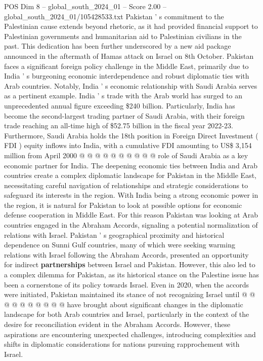 \begin{textsample}{POS Dim 8 – global\_south\_2024\_01 – Score 2.00 – global\_south\_2024\_01/105428533.txt}
Pakistan ' s commitment to the Palestinian cause extends beyond rhetoric, as it had provided financial support to Palestinian governments and humanitarian aid to Palestinian civilians in the past.
This dedication has been further underscored by a new aid package announced in the aftermath of Hamas attack on Israel on 8th October.
Pakistan faces a significant foreign policy challenge in the Middle East, primarily due to India ' s burgeoning economic interdependence and robust diplomatic ties with Arab countries.
Notably, India ' s economic relationship with Saudi Arabia serves as a pertinent example.
India ' s trade with the Arab world has surged to an unprecedented annual figure exceeding \$240 billion.
Particularly, India has become the second-largest trading partner of Saudi Arabia, with their foreign trade reaching an all-time high of \$52.75 billion in the fiscal year 2022-23.
Furthermore, Saudi Arabia holds the 18th position in Foreign Direct Investment ( FDI ) equity inflows into India, with a cumulative FDI amounting to US\$ 3,154 million from April 2000 @ @ @ @ @ @ @ @ @ @ role of Saudi Arabia as a key economic partner for India.
The deepening economic ties between India and Arab countries create a complex diplomatic landscape for Pakistan in the Middle East, necessitating careful navigation of relationships and strategic considerations to safeguard its interests in the region.
With India being a strong economic power in the region, it is natural for Pakistan to look at possible options for economic defense cooperation in Middle East.
For this reason Pakistan was looking at Arab countries engaged in the Abraham Accords, signaling a potential normalization of relations with Israel.
Pakistan ' s geographical proximity and historical dependence on Sunni Gulf countries, many of which were seeking warming relations with Israel following the Abraham Accords, presented an opportunity for indirect \textbf{partnerships} between Israel and Pakistan.
However, this also led to a complex dilemma for Pakistan, as its historical stance on the Palestine issue has been a cornerstone of its policy towards Israel.
Even in 2020, when the accords were initiated, Pakistan maintained its stance of not recognizing Israel until @ @ @ @ @ @ @ @ @ @ have brought about significant changes in the diplomatic landscape for both Arab countries and Israel, particularly in the context of the desire for reconciliation evident in the Abraham Accords.
However, these aspirations are encountering unexpected challenges, introducing complexities and shifts in diplomatic considerations for nations pursuing rapprochement with Israel.

\end{textsample}
